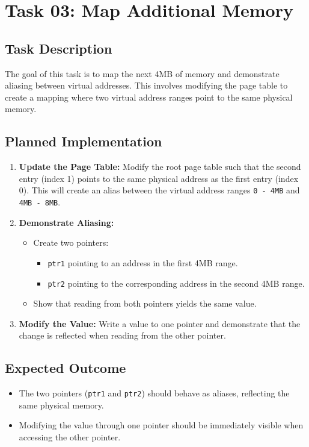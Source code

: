 \documentclass[a4paper,12pt]{report}
\begin{document}
\chapter{Task 03: Map Additional Memory}

\section{Task Description}
The goal of this task is to map the next 4MB of memory and demonstrate aliasing between virtual addresses. This involves modifying the page table to create a mapping where two virtual address ranges point to the same physical memory.

\section{Planned Implementation}
\begin{enumerate}
    \item \textbf{Update the Page Table:}
    Modify the root page table such that the second entry (index 1) points to the same physical address as the first entry (index 0). This will create an alias between the virtual address ranges \texttt{0 - 4MB} and \texttt{4MB - 8MB}.
    \item \textbf{Demonstrate Aliasing:}
    \begin{itemize}
        \item Create two pointers:
        \begin{itemize}
            \item \texttt{ptr1} pointing to an address in the first 4MB range.
            \item \texttt{ptr2} pointing to the corresponding address in the second 4MB range.
        \end{itemize}
        \item Show that reading from both pointers yields the same value.
    \end{itemize}
    \item \textbf{Modify the Value:}
    Write a value to one pointer and demonstrate that the change is reflected when reading from the other pointer.
\end{enumerate}

\section{Expected Outcome}
\begin{itemize}
    \item The two pointers (\texttt{ptr1} and \texttt{ptr2}) should behave as aliases, reflecting the same physical memory.
    \item Modifying the value through one pointer should be immediately visible when accessing the other pointer.
\end{itemize}
\end{document}
